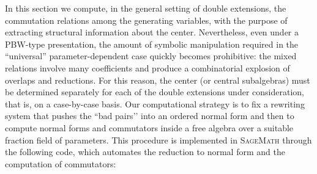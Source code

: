 \documentclass{amsart}
\theoremstyle{definition}
\theoremstyle{remark}
\numberwithin{equation}{section}
\begin{document}
In this section we compute, in the general setting of double extensions, the commutation relations among the generating variables, with the purpose of extracting structural information about the center. Nevertheless, even under a PBW-type presentation, the amount of symbolic manipulation required in the “universal” parameter-dependent case quickly becomes prohibitive: the mixed relations involve many coefficients and produce a combinatorial explosion of overlaps and reductions. For this reason, the center (or central subalgebras) must be determined separately for each of the double extensions under consideration, that is, on a case-by-case basis. Our computational strategy is to fix a rewriting system that pushes the “bad pairs’’ into an ordered normal form and then to compute normal forms and commutators inside a free algebra over a suitable fraction field of parameters. This procedure is implemented in \textsc{SageMath} through the following code, which automates the reduction to normal form and the computation of commutators:
\end{document}
